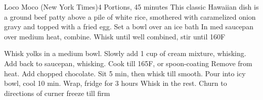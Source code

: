 \documentclass[a6paper,landscape]{article}
\begin{document}
\begin{recipe}{Loco Moco (New York Times)}{4 Portions, 45 minutes}{}
  \freeform This classic Hawaiian dish is a ground beef patty above a pile of white rice, smothered with caramelized onion gravy and topped with a fried egg.
  Set a bowl over an ice bath
  \newstep
  In med saucepan over medium heat, combine. Whisk until well combined, stir until 160\degree F

  Whisk yolks in a medium bowl. Slowly add 1 cup of cream mixture, whisking. Add back to saucepan, whisking. Cook till 165\degree F, or spoon-coating
  Remove from heat. Add chopped chocolate. Sit 5 min, then whisk till smooth.
  \newstep
  Pour into icy bowl, cool 10 min. Wrap, fridge for 3 hours
  Whisk in the rest. 
  \newstep
  Churn to directions of curner
  \newstep
  freeze till firm
  \end{recipe}
\end{document}
